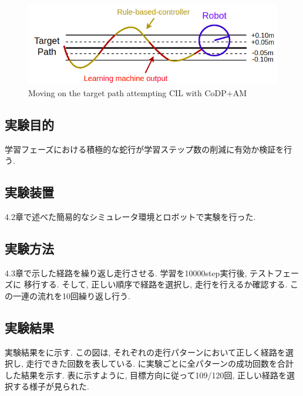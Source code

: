 \begin{figure}[hbtp]
  \centering
 \includegraphics[keepaspectratio, scale=0.58]
      {images/act1.5.png}
 \caption{Moving on the target path attempting CIL with CoDP+AM}
 \label{Fig:act1.5}
\end{figure}


  \subsection{実験目的}
  学習フェーズにおける積極的な蛇行が学習ステップ数の削減に有効か検証を行う.
  \subsection{実験装置}
  4.2章で述べた簡易的なシミュレータ環境とロボットで実験を行った.
  \subsection{実験方法}
  4.3章で示した経路を繰り返し走行させる. 学習を10000step実行後, テストフェーズに
  移行する. そして, 正しい順序で経路を選択し, 走行を行えるか確認する. こ
  の一連の流れを10回繰り返し行う.
  \subsection{実験結果}
  実験結果をに示す. この図は, それぞれの走行パターンにおいて正しく経路を選択し, 走行できた回数を表している. に実験ごとに全パターンの成功回数を合計した結果を示す. 
  表に示すように, 目標方向に従って109/120回, 正しい経路を選択する様子が見られた. 

